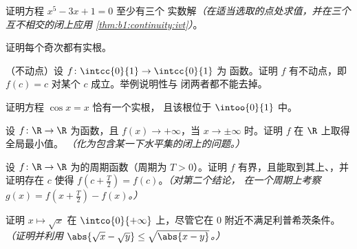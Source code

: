 \begin{exercise}[$\star$]\label{exo:b1:continuity:3}
证明方程 $x^5 - 3x + 1 = 0$ 至少有三个
实数解\emph{（在适当选取的点处求值，并在三个互不相交的闭上应用
\cref{thm:b1:continuity:ivt}）}。
\end{exercise}

\begin{exercise}[$\star$]\label{exo:b1:continuity:4}
证明每个奇次都有实根。
\end{exercise}

\begin{exercise}[$\star\star$]\label{exo:b1:continuity:5}
（不动点）设 $f \colon \intcc{0}{1} \to \intcc{0}{1}$ 为
函数。证明 $f$ 有不动点，即 $f(c) = c$ 对某个
$c$ 成立。举例说明性与
闭两者都不能去掉。
\end{exercise}

\begin{exercise}[$\star\star$]\label{exo:b1:continuity:6}
证明方程 $\cos x = x$ 恰有一个实根，
且该根位于 $\intoo{0}{1}$ 中。
\end{exercise}

\begin{exercise}[$\star\star$]\label{exo:b1:continuity:7}
设 $f \colon \R \to \R$ 为函数，且 $f(x) \to +\infty$，当 $x
\to \pm\infty$ 时。证明 $f$ 在 $\R$ 上取得全局最小值。
\emph{（化为包含某一下水平集的闭上的问题。）}
\end{exercise}

\begin{exercise}[$\star\star$]\label{exo:b1:continuity:8}
设 $f \colon \R \to \R$ 为的周期函数（周期为 $T >
0$）。证明 $f$ 有界，且能取到其上、，并证明存在
$c$ 使得 $f(c + \frac T2) = f(c)$。\emph{（对第二个结论，
在一个周期上考察 $g(x) = f(x + \frac T2) - f(x)$。）}
\end{exercise}

\begin{exercise}[$\star\star$]\label{exo:b1:continuity:9}
证明 $x \mapsto \sqrt x$ 在
$\intco{0}{+\infty}$ 上，尽管它在 $0$ 附近不满足利普希茨条件。
\emph{（证明并利用 $\abs{\sqrt x - \sqrt y} \leq \sqrt{\abs{x -
y}}$。）}
\end{exercise}

